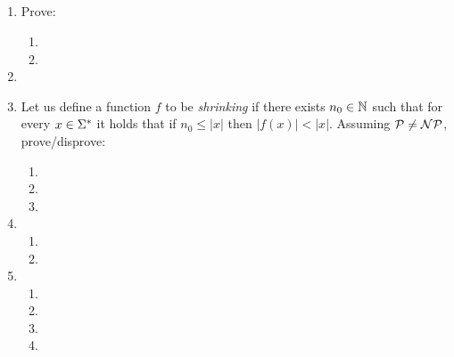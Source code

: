 \documentclass{article}
\title{
    \textmd{\bd{\hmwkClass:\ \hmwkTitle}}\\
}
\author{\hmwkAuthorName}
\begin{document}
\maketitle
\thispagestyle{firststyle}

\begin{enumerate}
    \item Prove:
          \begin{enumerate}
              \item 
                    \pagebreak
              \item 
          \end{enumerate}

          \pagebreak

    \item 

          \pagebreak

    \item Let us define a function $f$ to be {\it shrinking} if there exists $n_0 \in \mathbb{N}$ such that
          for every $x \in \Sigma^*$ it holds that if $n_0 \leq |x|$ then $|f(x)| < |x|$.
          Assuming $\mathcal{P} \neq \mathcal{N}\mathcal{P}$, prove/disprove:

          \begin{enumerate}
              \item 
              \item 
              \item 
          \end{enumerate}

          \pagebreak

    \item
          \begin{enumerate}
              \item 
              \item 
          \end{enumerate}

          \pagebreak

    \item
          \begin{enumerate}
              \item 
              \item 
              \item 
              \item 
          \end{enumerate}

\end{enumerate}
\end{document}
